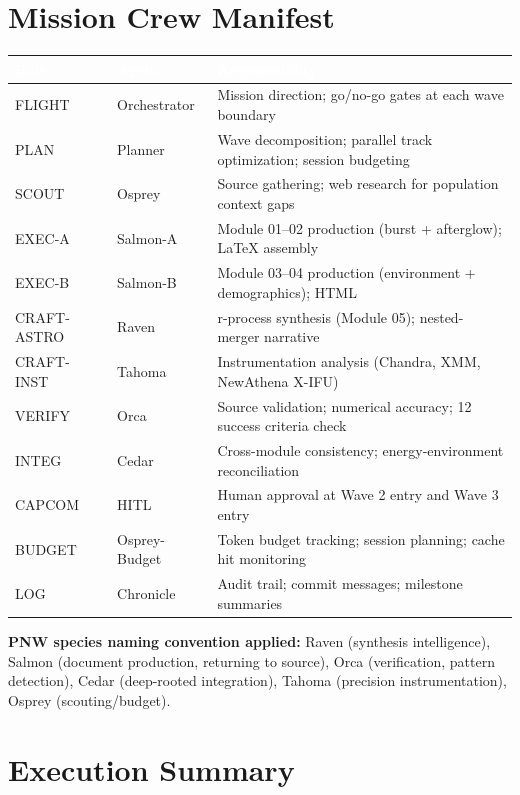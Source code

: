 \documentclass[11pt,letterpaper]{article}
\newcommand{\tableheader}[1]{\textbf{\sffamily\textcolor{white}{#1}}}
\begin{document}
\section{Mission Crew Manifest}

\begin{center}
\begin{tabularx}{\textwidth}{L{2cm}L{3cm}X}
\toprule
{}
\tableheader{Role} & \tableheader{Agent} & \tableheader{Responsibility} \\
\midrule
FLIGHT & Orchestrator & Mission direction; go/no-go gates at each wave boundary \\
PLAN & Planner & Wave decomposition; parallel track optimization; session budgeting \\
SCOUT & Osprey & Source gathering; web research for population context gaps \\
EXEC-A & Salmon-A & Module 01--02 production (burst + afterglow); LaTeX assembly \\
EXEC-B & Salmon-B & Module 03--04 production (environment + demographics); HTML \\
CRAFT-ASTRO & Raven & r-process synthesis (Module 05); nested-merger narrative \\
CRAFT-INST & Tahoma & Instrumentation analysis (Chandra, XMM, NewAthena X-IFU) \\
VERIFY & Orca & Source validation; numerical accuracy; 12 success criteria check \\
INTEG & Cedar & Cross-module consistency; energy-environment reconciliation \\
CAPCOM & HITL & Human approval at Wave 2 entry and Wave 3 entry \\
BUDGET & Osprey-Budget & Token budget tracking; session planning; cache hit monitoring \\
LOG & Chronicle & Audit trail; commit messages; milestone summaries \\
\bottomrule
\end{tabularx}
\end{center}

\textbf{PNW species naming convention applied:} Raven (synthesis intelligence), Salmon (document production, returning to source), Orca (verification, pattern detection), Cedar (deep-rooted integration), Tahoma (precision instrumentation), Osprey (scouting/budget).

\section{Execution Summary}
\end{document}
